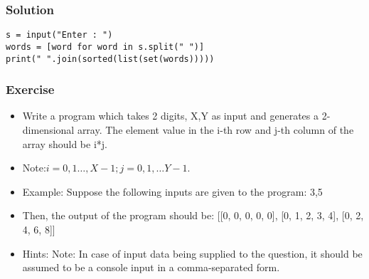 \begin{frame}[fragile]\frametitle{Solution}
  \begin{lstlisting}
s = input("Enter : ")
words = [word for word in s.split(" ")]
print(" ".join(sorted(list(set(words)))))
  \end{lstlisting}
\end{frame}



\begin{frame}[fragile]\frametitle{Exercise}
  \begin{itemize}
  \item Write a program which takes 2 digits, X,Y as input and generates a 2-dimensional array. The element value in the i-th row and j-th column of the array should be i*j.
  \item Note:$ i=0,1 \ldots, X-1; j=0,1, \ldots Y-1.$
  \item Example: Suppose the following inputs are given to the program: 3,5
  \item Then, the output of the program should be: [[0, 0, 0, 0, 0], [0, 1, 2, 3, 4], [0, 2, 4, 6, 8]] 
  \item Hints: Note: In case of input data being supplied to the question, it should be assumed to be a console input in a comma-separated form.

  \end{itemize}  
\end{frame}

